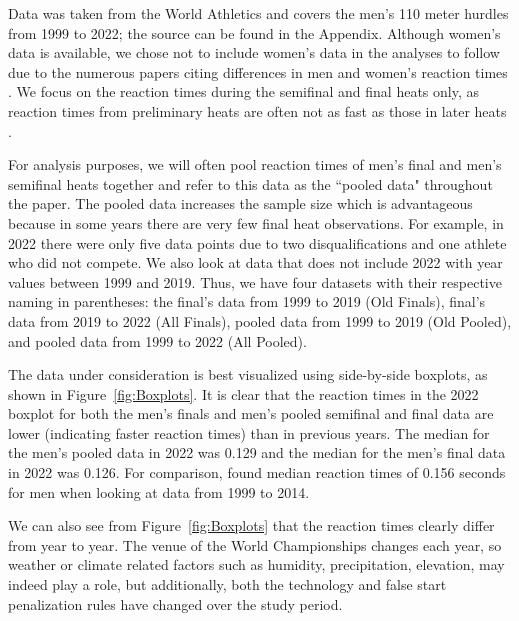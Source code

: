 \documentclass[12pt, letterpaper, titlepage]{article}
\newcommand{\of}[1]{\textcolor{violet}{OF: #1}}
\begin{document}
Data was taken from the World Athletics 
and covers the men's 110 meter hurdles from 1999 to 2022; the source can be 
found in the Appendix.
Although women's data is available, we chose not to include women's data in the
analyses to follow due to the numerous papers citing differences in men and
women's reaction times \citep[e.g.,][]{lipps2011implications, 
babicc2009reaction, panoutsakopoulos2020gender}.
We focus on the reaction times during the semifinal and final heats only, as 
reaction times from preliminary heats are often not as fast as those in later 
heats \citep[e.g.,][]{zhang2021correlation}. 

For analysis purposes, we will often pool reaction times of men's final and 
men's semifinal heats together and refer to this data as the ``pooled data"
throughout the paper. 
The pooled data increases the sample size which is advantageous because in some
years there are very few final heat observations.  For example, in 2022 there
were only five data points due to two disqualifications and one athlete who 
did not compete.  We also look at data that does not include 2022 with year values
between 1999 and 2019.  Thus, we have four datasets with their respective naming
in parentheses: the final's data from 1999 to 2019 (Old Finals), final's data 
from 2019 to 2022 (All Finals), pooled data from 1999 to 2019 (Old Pooled), and 
pooled data from 1999 to 2022 (All Pooled).

The data under consideration is best visualized using side-by-side boxplots, as
shown in Figure~\ref{fig:Boxplots}.  It is clear that the reaction times in the 
2022 boxplot for both 
the men's finals and men's pooled semifinal and final data are lower (indicating 
faster reaction times)
than in previous years.  The median for the men's pooled data in 2022 was 0.129
and the median for the men's final data in 2022 was 0.126.  For comparison,
\citet{brosnan2017effects} found median reaction times of 0.156 seconds 
for men when looking at data from 1999 to 2014.

We can also see from Figure~\ref{fig:Boxplots} that the reaction times clearly
differ from year to year. The venue of the World Championships changes each 
year, so weather or climate related factors such as humidity, precipitation, 
elevation, may indeed play a role, but additionally, both the technology and 
false start penalization rules have changed over the study period.
\end{document}
